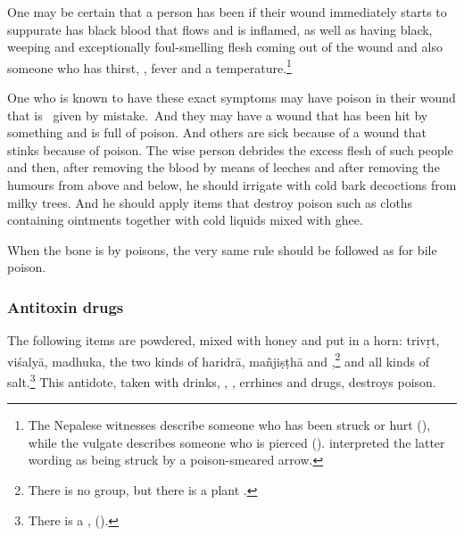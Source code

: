 \begin{translation}
\begin{sloka}
    One may be certain that a person has been  if their wound immediately starts to suppurate
has black blood that flows and is inflamed, as well as having black,
weeping and exceptionally foul-smelling flesh coming out of the wound
and also someone who has thirst, , fever and a
temperature.\footnote{The Nepalese witnesses describe someone who has
    been struck or hurt (), while the vulgate describes
    someone who is pierced (). 
    interpreted the latter wording as being struck by a poison-smeared arrow.}
\end{sloka}

\item[58.1--60]

\begin{sloka}
    
    One who is known to have these exact symptoms may have poison
    in their wound  that is \dag\ given by mistake.\dag\ And they may have 
    a wound that  has been hit by something
     and is full of poison. And others
    are sick because of a wound that stinks because of poison.  
    The wise person debrides the excess flesh of such people and then, after
    removing the blood by means of leeches and after removing the
    humours from above and below, he should irrigate with cold bark
    decoctions from milky trees.   And he should apply items that destroy poison 
    such as cloths containing 
    ointments together with cold liquids mixed with ghee.
        
\end{sloka}
    
\item[61ab]    

\begin{sloka}
    When the bone is  by poisons, the very same rule should be 
    followed as for bile poison.
\end{sloka}

\subsubsection{Antitoxin drugs}
\item[61cd--63ab] 
\begin{sloka}
The following items are powdered, mixed with honey and put in a horn:
%
\gls{trivṛt}, \gls{viśalyā}, \gls{madhuka}, the two kinds of
\gls{haridrā}, \gls{mañjiṣṭhā} and ,\footnote{There
    is no  group, but there is a plant .} and all
    kinds of salt.\footnote{There is a ,
        ().}  This antidote, taken with drinks,
        , , errhines and drugs,
        destroys poison.


\end{sloka}
\end{translation}
